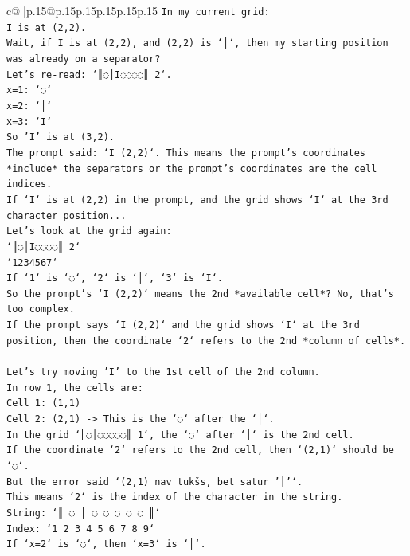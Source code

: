 \documentclass{article}
\begin{document}
{\begin{supertabular}{c@{$\;$}|p{.15\linewidth}@{}p{.15\linewidth}p{.15\linewidth}p{.15\linewidth}p{.15\linewidth}p{.15\linewidth}}
{{{\texttt{In my current grid:} \\
\texttt{I is at (2,2).} \\
\texttt{Wait, if I is at (2,2), and (2,2) is `│`, then my starting position was already on a separator?} \\
\texttt{Let's re{-}read: `║◌│I◌◌◌◌║ 2`.} \\
\texttt{x=1: `◌`} \\
\texttt{x=2: `│`} \\
\texttt{x=3: `I`} \\
\texttt{So 'I' is at (3,2).} \\
\texttt{The prompt said: `I (2,2)`. This means the prompt's coordinates *include* the separators or the prompt's coordinates are the cell indices.} \\
\texttt{If `I` is at (2,2) in the prompt, and the grid shows `I` at the 3rd character position...} \\
\texttt{Let's look at the grid again:} \\
\texttt{`║◌│I◌◌◌◌║ 2`} \\
\texttt{`1234567`} \\
\texttt{If `1` is `◌`, `2` is `│`, `3` is `I`.} \\
\texttt{So the prompt's `I (2,2)` means the 2nd *available cell*? No, that's too complex.} \\
\texttt{If the prompt says `I (2,2)` and the grid shows `I` at the 3rd position, then the coordinate `2` refers to the 2nd *column of cells*.} \\
\\ 
\texttt{Let's try moving 'I' to the 1st cell of the 2nd column.} \\
\texttt{In row 1, the cells are:} \\
\texttt{Cell 1: (1,1)} \\
\texttt{Cell 2: (2,1) {-}> This is the `◌` after the `│`.} \\
\texttt{In the grid `║◌│◌◌◌◌◌║ 1`, the `◌` after `│` is the 2nd cell.} \\
\texttt{If the coordinate `2` refers to the 2nd cell, then `(2,1)` should be `◌`.} \\
\texttt{But the error said `(2,1) nav tukšs, bet satur '│'`.} \\
\texttt{This means `2` is the index of the character in the string.} \\
\texttt{String: `║ ◌ │ ◌ ◌ ◌ ◌ ◌ ║`} \\
\texttt{Index: `1 2 3 4 5 6 7 8 9`} \\
\texttt{If `x=2` is `◌`, then `x=3` is `│`.} \\
}}}
\end{supertabular}}
\end{document}
